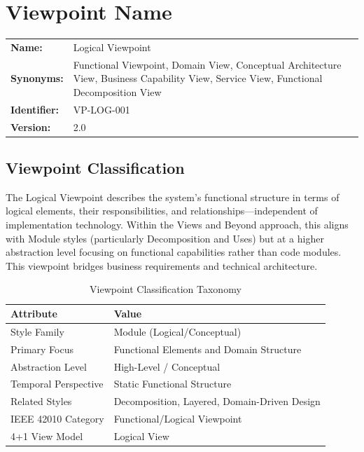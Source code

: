 \documentclass[11pt,letterpaper]{article}
\begin{document}
\clearpage
\hypersetup{pageanchor=true}


\tableofcontents
\newpage

\section{Viewpoint Name}

\begin{definitionbox}
\begin{tabular}{@{}L{3.5cm}L{10cm}@{}}
\textbf{Name:} & Logical Viewpoint \\[0.5em]
\textbf{Synonyms:} & Functional Viewpoint, Domain View, Conceptual Architecture View, Business Capability View, Service View, Functional Decomposition View \\[0.5em]
\textbf{Identifier:} & VP-LOG-001 \\[0.5em]
\textbf{Version:} & 2.0 \\
\end{tabular}
\end{definitionbox}

\subsection{Viewpoint Classification}

The Logical Viewpoint describes the system's functional structure in terms of logical elements, their responsibilities, and relationships---independent of implementation technology. Within the Views and Beyond approach, this aligns with Module styles (particularly Decomposition and Uses) but at a higher abstraction level focusing on functional capabilities rather than code modules. This viewpoint bridges business requirements and technical architecture.

\begin{table}[H]
\centering
\caption{Viewpoint Classification Taxonomy}
\begin{tabular}{@{}L{4cm}L{10cm}@{}}
\toprule
\textbf{Attribute} & \textbf{Value} \\
\midrule
Style Family & Module (Logical/Conceptual) \\
Primary Focus & Functional Elements and Domain Structure \\
Abstraction Level & High-Level / Conceptual \\
Temporal Perspective & Static Functional Structure \\
Related Styles & Decomposition, Layered, Domain-Driven Design \\
IEEE 42010 Category & Functional/Logical Viewpoint \\
4+1 View Model & Logical View \\
\bottomrule
\end{tabular}
\end{table}
\end{document}
